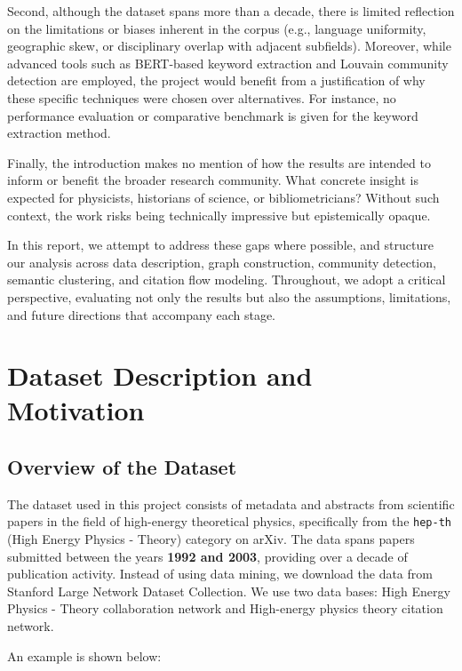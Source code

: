 \documentclass[12pt]{article}
\begin{document}
Second, although the dataset spans more than a decade, there is limited reflection on the limitations or biases inherent in the corpus (e.g., language uniformity, geographic skew, or disciplinary overlap with adjacent subfields). Moreover, while advanced tools such as BERT-based keyword extraction and Louvain community detection are employed, the project would benefit from a justification of why these specific techniques were chosen over alternatives. For instance, no performance evaluation or comparative benchmark is given for the keyword extraction method.

Finally, the introduction makes no mention of how the results are intended to inform or benefit the broader research community. What concrete insight is expected for physicists, historians of science, or bibliometricians? Without such context, the work risks being technically impressive but epistemically opaque.

In this report, we attempt to address these gaps where possible, and structure our analysis across data description, graph construction, community detection, semantic clustering, and citation flow modeling. Throughout, we adopt a critical perspective, evaluating not only the results but also the assumptions, limitations, and future directions that accompany each stage.


\section{Dataset Description and Motivation}

\subsection{Overview of the Dataset}

The dataset used in this project consists of metadata and abstracts from scientific papers in the field of high-energy theoretical physics, specifically from the \texttt{hep-th} (High Energy Physics - Theory) category on arXiv. The data spans papers submitted between the years \textbf{1992 and 2003}, providing over a decade of publication activity. Instead of using data mining, we download the data from Stanford Large Network Dataset Collection. We use two data bases: High Energy Physics - Theory collaboration network and High-energy physics theory citation network.

An example is shown below:
\end{document}
